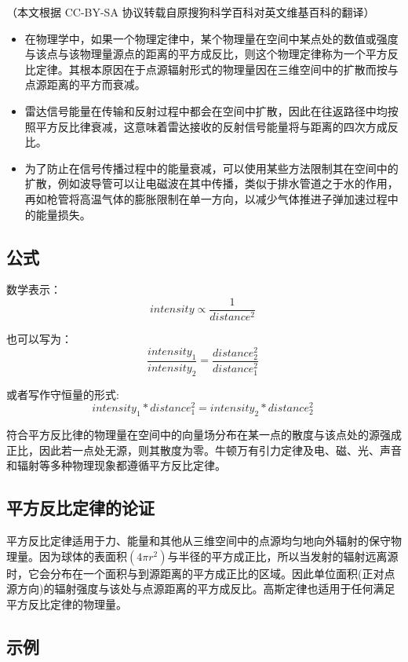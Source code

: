 
（本文根据 CC-BY-SA 协议转载自原搜狗科学百科对英文维基百科的翻译）
\begin{itemize}
\item 在物理学中，如果一个物理定律中，某个物理量在空间中某点处的数值或强度与该点与该物理量源点的距离的平方成反比，则这个物理定律称为一个平方反比定律。其根本原因在于点源辐射形式的物理量因在三维空间中的扩散而按与点源距离的平方而衰减。
\item 雷达信号能量在传输和反射过程中都会在空间中扩散，因此在往返路径中均按照平方反比律衰减，这意味着雷达接收的反射信号能量将与距离的四次方成反比。
\item 为了防止在信号传播过程中的能量衰减，可以使用某些方法限制其在空间中的扩散，例如波导管可以让电磁波在其中传播，类似于排水管道之于水的作用，再如枪管将高温气体的膨胀限制在单一方向，以减少气体推进子弹加速过程中的能量损失。
\end{itemize}
\subsection{公式}
数学表示：
\begin{equation}
intensity \propto \frac{1}{distance^2}~
\end{equation}

也可以写为：\begin{equation}
\frac{intensity_1}{intensity_2}=\frac{distance_2^2}{distance_1^2}~ 
\end{equation}

或者写作守恒量的形式:\begin{equation}
intensity_1 * distance_1^2 =intensity_2*distance_2^2~
\end{equation}

符合平方反比律的物理量在空间中的向量场分布在某一点的散度与该点处的源强成正比，因此若一点处无源，则其散度为零。牛顿万有引力定律及电、磁、光、声音和辐射等多种物理现象都遵循平方反比定律。
\subsection{ 平方反比定律的论证}
平方反比定律适用于力、能量和其他从三维空间中的点源均匀地向外辐射的保守物理量。因为球体的表面积$(4\pi r^2)$与半径的平方成正比，所以当发射的辐射远离源时，它会分布在一个面积与到源距离的平方成正比的区域。因此单位面积(正对点源方向)的辐射强度与该处与点源距离的平方成反比。高斯定律也适用于任何满足平方反比定律的物理量。

\subsection{示例}
